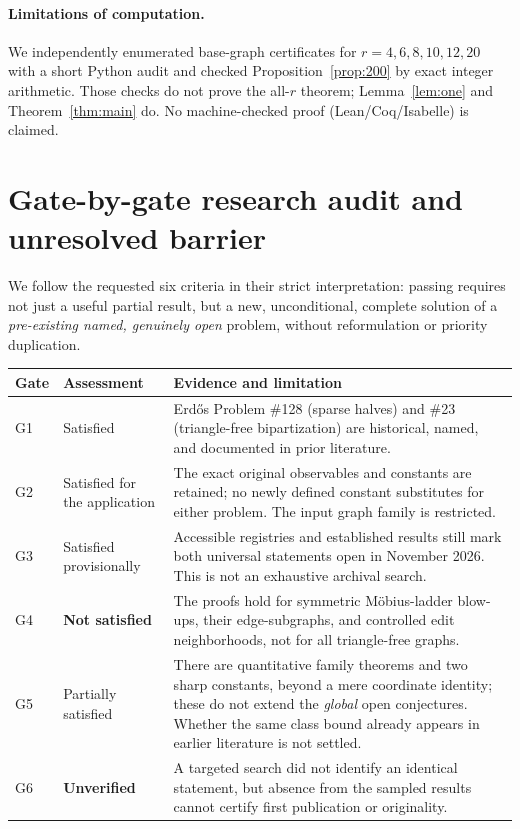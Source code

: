 \documentclass[11pt,a4paper]{article}
\begin{document}
\paragraph{Limitations of computation.}
We independently enumerated base-graph certificates for $r=4,6,8,10,12,20$ with a short Python audit and checked Proposition~\ref{prop:200} by exact integer arithmetic. Those checks do not prove the all-$r$ theorem; Lemma~\ref{lem:one} and Theorem~\ref{thm:main} do. No machine-checked proof (Lean/Coq/Isabelle) is claimed.

\section{Gate-by-gate research audit and unresolved barrier}
We follow the requested six criteria in their strict interpretation: passing requires not just a useful partial result, but a new, unconditional, complete solution of a \emph{pre-existing named, genuinely open} problem, without reformulation or priority duplication.
\begin{center}
\small
\begin{tabularx}{0.986\linewidth}{@{}p{0.85cm}p{2.7cm}X@{}}
\toprule
Gate & Assessment & Evidence and limitation\\
\midrule
G1 & Satisfied & Erd\H{o}s Problem \#128 (sparse halves) and \#23 (triangle-free bipartization) are historical, named, and documented in prior literature.\\
G2 & Satisfied for the application & The exact original observables and constants are retained; no newly defined constant substitutes for either problem. The input graph family is restricted.\\
G3 & Satisfied provisionally & Accessible registries and established results still mark both universal statements open in November 2026. This is not an exhaustive archival search.\\
G4 & \textbf{Not satisfied} & The proofs hold for symmetric M\"obius-ladder blow-ups, their edge-subgraphs, and controlled edit neighborhoods, not for all triangle-free graphs.\\
G5 & Partially satisfied & There are quantitative family theorems and two sharp constants, beyond a mere coordinate identity; these do not extend the \emph{global} open conjectures. Whether the same class bound already appears in earlier literature is not settled.\\
G6 & \textbf{Unverified} & A targeted search did not identify an identical statement, but absence from the sampled results cannot certify first publication or originality.\\
\bottomrule
\end{tabularx}
\end{center}
\end{document}
